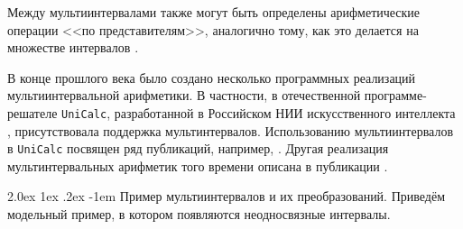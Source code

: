 \documentclass[a5paper,openany]{book}
\makeatletter
\renewcommand\paragraph{\@startsection{paragraph}{4}{\z@}%
                         {2.0ex \@plus1ex \@minus.2ex}%
                         {-1em}%
                         {\normalfont\normalsize\bfseries}}
\makeatother
\begin{document}
 Между мультиинтервалами также могут быть определены арифметические операции 
 <<по представителям>>, аналогично тому, как это делается на множестве интервалов 
 \cite{Iakovlev1968}. 
   
В конце прошлого века было создано несколько программных реализаций мультиинтервальной 
арифметики. В частности, в отечественной программе-решателе  \texttt{UniCalc}, 
разработанной  в Российском НИИ искусственного интеллекта \cite{UniCalc}, присутствовала 
поддержка  мультинтервалов. Использованию мультиинтервалов в {\tt UniCalc} посвящен ряд 
публикаций,  например, \cite{JCT97}. Другая реализация мультинтервальных  арифметик того 
времени описана в публикации \cite{InCpp}. 
  
\paragraph{Пример мультиинтервалов и их преобразований.} 	
Приведём модельный пример, в котором появляются неодносвязные интервалы. 
  
\end{document}
